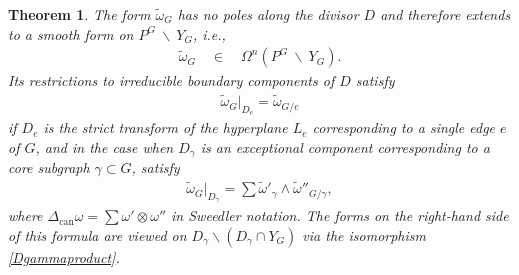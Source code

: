 \documentclass[pdftex]{sigma}%
\newtheorem{thm}{Theorem}[section]
\numberwithin{equation}{section}
\newcommand{\can}{\mathrm{can}}
\newcommand{\0}{\color{blue}{\mathsf{0}}}
\begin{document}
\begin{thm} \label{thm: nopolesonD}
The form $\widetilde{\omega}_G$ has no poles along the divisor $D$ and therefore extends to a smooth form on $P^G \ \backslash \ Y_G$, i.e.,
\begin{gather*}
\widetilde{\omega}_G \quad \in \quad \Omega^{n} \left(P^G \ \backslash \ Y_G \right).
\end{gather*}
Its restrictions to irreducible boundary components of $D$ satisfy
\begin{gather*}
\widetilde{\omega}_G\big|_{D_e} = \widetilde{\omega}_{G/e}
\end{gather*}
if $D_e$ is the strict transform of the hyperplane $L_e$ corresponding to a single edge $e$ of $G$, and in the case when $D_{\gamma}$ is an exceptional component corresponding to a core subgraph $\gamma \subset G$, satisfy
\begin{gather} \label{RestrictomegaToDgammaAndCoproduct}
 \widetilde{\omega}_G\big|_{D_{\gamma}} = \sum \widetilde{\omega}'_{\gamma}\wedge \widetilde{\omega}''_{G/\gamma},
 \end{gather}
where $\Delta_{\can} \omega = \sum \omega' \otimes \omega''$ in Sweedler notation.
The forms on the right-hand side of this formula are viewed on $D_{\gamma} \backslash (D_{\gamma} \cap Y_{G})$ via the isomorphism \eqref{Dgammaproduct}.
\end{thm}
\end{document}
